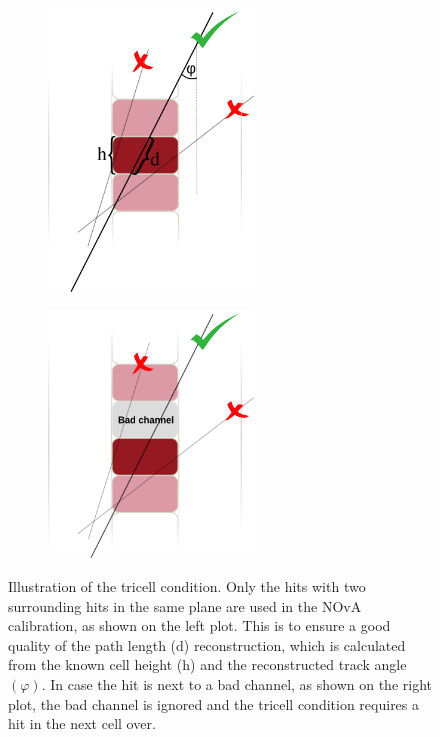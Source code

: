 \begin{figure}[hbtp]
\centering
\begin{subfigure}[b]{0.49\textwidth}
\centering
\includegraphics[width=0.6\textwidth]{Plots/NOvAExperiment/TricellConditionWithDescription.png}
\end{subfigure}
\begin{subfigure}[b]{0.49\textwidth}
\centering
\includegraphics[width=0.6\textwidth]{Plots/NOvAExperiment/TricellConditionWithBadChannel.png}
\end{subfigure}
\caption[Tricell condition for calibration hits in NOvA]{Illustration of the tricell condition. Only the hits with two surrounding hits in the same plane are used in the \acrshort{NOvA} calibration, as shown on the left plot. This is to ensure a good quality of the path length (d) reconstruction, which is calculated from the known cell height (h) and the reconstructed track angle $\left(\varphi\right)$. In case the hit is next to a bad channel, as shown on the right plot, the bad channel is ignored and the tricell condition requires a hit in the next cell over.}
\label{fig:NOvATricellCondition}
\end{figure}

